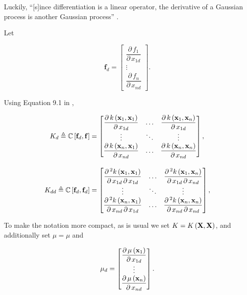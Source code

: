 \documentclass{draft}
\newcommand{\pd}{\ensuremath{\partial \,}}     %
\newcommand{\gradient}{\ensuremath{\mathbf{f}_d}} %
\begin{document}
Luckily, ``[s]ince differentiation is a linear operator, the derivative of a Gaussian process is another Gaussian process''
\citep[191]{RasmussenWilliams2006Gaussian}.

Let

\begin{equation}
    \gradient = 
    \begin{bmatrix}
        \dfrac{\pd f_1}{\pd x_{1d}} \\
        \vdots \\
        \dfrac{\pd f_n}{\pd x_{nd}}
    \end{bmatrix}.
\end{equation}

Using Equation 9.1 in \citet{RasmussenWilliams2006Gaussian},

\begin{align}
    K_d \triangleq
    \C \left[ \gradient, \mbf{f} \right]
    & = 
    \begin{bmatrix}
        \dfrac{\pd k \left(\mbf{x}_1, \mbf{x}_1 \right)}{\pd x_{1d}} & \ldots & \dfrac{\pd k \left(\mbf{x}_1, \mbf{x}_n \right)}{\pd x_{1d}} \\
        \vdots                                                       & \ddots & \vdots \\
        \dfrac{\pd k \left(\mbf{x}_n, \mbf{x}_1 \right)}{\pd x_{nd}} & \ldots & \dfrac{\pd k \left(\mbf{x}_n, \mbf{x}_n \right)}{\pd x_{nd}}
    \end{bmatrix}, \\[1em]
    K_{dd} \triangleq
    \C \left[ \gradient, \gradient \right]
    & = 
    \begin{bmatrix}
        \dfrac{\pd^2 k \left(\mbf{x}_1, \mbf{x}_1 \right)}{\pd x_{1d} \, \pd x_{1d}} & \ldots & \dfrac{\pd^2 k \left(\mbf{x}_1, \mbf{x}_n \right)}{\pd x_{1d} \, \pd x_{nd}} \\
        \vdots                                                       & \ddots & \vdots \\
        \dfrac{\pd^2 k \left(\mbf{x}_n, \mbf{x}_1 \right)}{\pd x_{nd} \, \pd x_{1d}} & \ldots & \dfrac{\pd^2 k \left(\mbf{x}_n, \mbf{x}_n \right)}{\pd x_{nd} \, \pd x_{nd}}
    \end{bmatrix},
\end{align}

To make the notation more compact, as is usual we set \( K = K \left( \mathbf{X}, \mathbf{X} \right) \), 
and additionally set \( \mu = \mu \)
and

\begin{equation}
    \mu_d
    =
    \begin{bmatrix}
        \dfrac{\pd \mu \left( \mbf{x}_1 \right)}{\pd x_{1d}} \\
        \vdots \\
        \dfrac{\pd \mu \left( \mbf{x}_n \right)}{\pd x_{nd}}
    \end{bmatrix}.
\end{equation}
\end{document}
